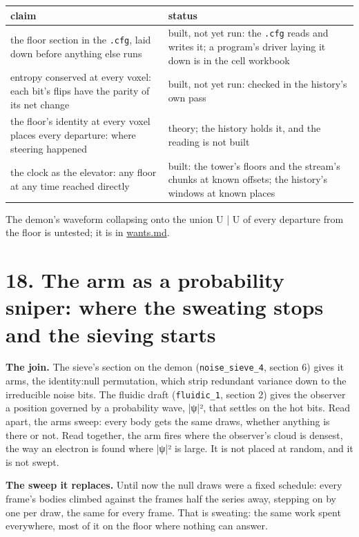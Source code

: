 {\small
\setlength{\tabcolsep}{6pt}
\begin{longtable}{>{\RaggedRight\arraybackslash}p{}>{\RaggedRight\arraybackslash}p{}}
\toprule
claim & status \\
\midrule
\endhead
the floor section in the \texttt{.\allowbreak{}cfg}, laid down before anything else runs & built, not yet run: the \texttt{.\allowbreak{}cfg} reads and writes it; a program's driver laying it down is in the cell workbook \\
entropy conserved at every voxel: each bit's flips have the parity of its net change & built, not yet run: checked in the history's own pass \\
the floor's identity at every voxel places every departure: where steering happened & theory; the history holds it, and the reading is not built \\
the clock as the elevator: any floor at any time reached directly & built: the tower's floors and the stream's chunks at known offsets; the history's windows at known places \\
\bottomrule
\end{longtable}
}

The demon's waveform collapsing onto the union U | U of every departure from the floor is untested; it is in \hyperref[chap:wants]{wants.md}.

\section{\texorpdfstring{18. The arm as a probability sniper: where the sweating stops and the sieving starts}{18. The arm as a probability sniper: where the sweating stops and the sieving starts}}

\textbf{The join.} The sieve's section on the demon (\texttt{noise\_\allowbreak{}sieve\_\allowbreak{}4}, section 6) gives it arms, the identity:null permutation, which strip redundant variance down to the irreducible noise bits. The fluidic draft (\texttt{fluidic\_\allowbreak{}1}, section 2) gives the observer a position governed by a probability wave, |ψ|², that settles on the hot bits. Read apart, the arms sweep: every body gets the same draws, whether anything is there or not. Read together, the arm fires where the observer's cloud is densest, the way an electron is found where |ψ|² is large. It is not placed at random, and it is not swept.

\textbf{The sweep it replaces.} Until now the null draws were a fixed schedule: every frame's bodies climbed against the frames half the series away, stepping on by one per draw, the same for every frame. That is sweating: the same work spent everywhere, most of it on the floor where nothing can answer.

